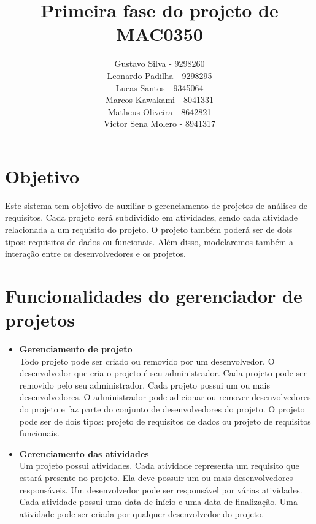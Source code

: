 \documentclass{article}
\title{Primeira fase do projeto de MAC0350}
\author{Gustavo Silva - 9298260\\Leonardo Padilha - 9298295 \\Lucas Santos - 9345064 \\Marcos Kawakami - 8041331 \\Matheus Oliveira - 8642821 \\Victor Sena Molero - 8941317}
\date{}
\begin{document}
\maketitle

\section{Objetivo}
Este sistema tem objetivo de auxiliar o gerenciamento de projetos de análises de requisitos. Cada projeto será subdividido em atividades, sendo cada atividade relacionada a um requisito do projeto. O projeto também poderá ser de dois tipos: requisitos de dados ou funcionais. Além disso, modelaremos também a interação entre os desenvolvedores e os projetos.

\section{Funcionalidades do gerenciador de projetos}
\begin{itemize}
    \item \textbf{Gerenciamento de projeto}
    \\Todo projeto pode ser criado ou removido por um desenvolvedor. O desenvolvedor que cria o projeto é seu administrador. Cada projeto pode ser removido pelo seu administrador. Cada projeto possui um ou mais desenvolvedores. O administrador pode adicionar ou remover desenvolvedores do projeto e faz parte do conjunto de desenvolvedores do projeto. O projeto pode ser de dois tipos: projeto de requisitos de dados ou projeto de requisitos funcionais.
    \item \textbf{Gerenciamento das atividades}
    \\Um projeto possui atividades. Cada atividade representa um requisito que estará presente no projeto. Ela deve possuir um ou mais desenvolvedores responsáveis. Um desenvolvedor pode ser responsável por várias atividades. Cada atividade possui uma data de início e uma data de finalização. Uma atividade pode ser criada por qualquer desenvolvedor do projeto.
\end{itemize}
\end{document}
